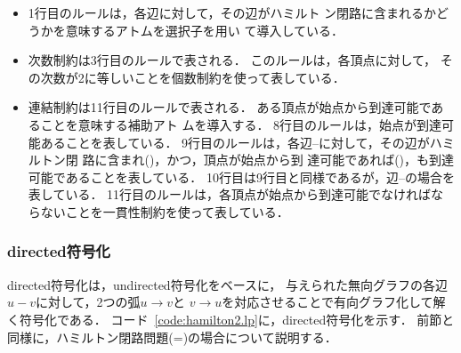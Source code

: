 \begin{itemize}
\item 1行目のルールは，各辺に対して，その辺がハミルト
  ン閉路に含まれるかどうかを意味するアトムを選択子を用い
  て導入している．
\item 次数制約は3行目のルールで表される．
  このルールは，各頂点に対して，
  その次数が2に等しいことを個数制約を使って表している．
\item 連結制約は11行目のルールで表される．
ある頂点が始点から到達可能であることを意味する補助アト
ムを導入する．
8行目のルールは，始点が到達可能あることを表している．
9行目のルールは，各辺--に対して，その辺がハミルトン閉
路に含まれ()，かつ，頂点が始点から到
達可能であれば()，も到達可能であることを表している．
10行目は9行目と同様であるが，辺--の場合を表している．
11行目のルールは，各頂点が始点から到達可能でなければな
らないことを一貫性制約を使って表している．
\end{itemize}

\subsubsection{\textsf{directed}符号化}



\textsf{directed}符号化は，\textsf{undirected}符号化をベースに，
与えられた無向グラフの各辺$u-v$に対して，2つの弧$u\rightarrow v$と
$v\rightarrow u$を対応させることで有向グラフ化して解く符号化である．
コード~\ref{code:hamilton2.lp}に，\textsf{directed}符号化を示す．
前節と同様に，ハミルトン閉路問題(=)の場合について説明する．

